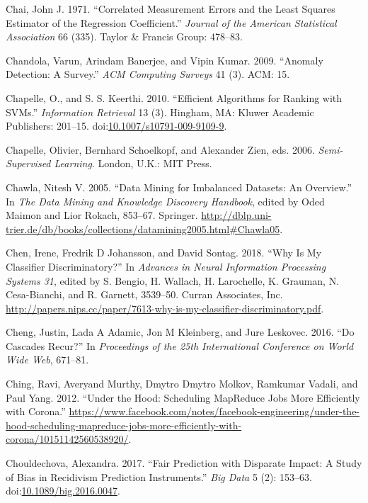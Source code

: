 \documentclass[]{krantz}
\begin{document}
\hypertarget{ref-chai1971correlated}{}
Chai, John J. 1971. ``Correlated Measurement Errors and the Least
Squares Estimator of the Regression Coefficient.'' \emph{Journal of the
American Statistical Association} 66 (335). Taylor \& Francis Group:
478--83.

\hypertarget{ref-chandola2009anomaly}{}
Chandola, Varun, Arindam Banerjee, and Vipin Kumar. 2009. ``Anomaly
Detection: A Survey.'' \emph{ACM Computing Surveys} 41 (3). ACM: 15.

\hypertarget{ref-Chapelle2010}{}
Chapelle, O., and S. S. Keerthi. 2010. ``Efficient Algorithms for
Ranking with SVMs.'' \emph{Information Retrieval} 13 (3). Hingham, MA:
Kluwer Academic Publishers: 201--15.
doi:\href{https://doi.org/10.1007/s10791-009-9109-9}{10.1007/s10791-009-9109-9}.

\hypertarget{ref-Chapelle2006}{}
Chapelle, Olivier, Bernhard Schoelkopf, and Alexander Zien, eds. 2006.
\emph{Semi-Supervised Learning}. London, U.K.: MIT Press.

\hypertarget{ref-Chawla05}{}
Chawla, Nitesh V. 2005. ``Data Mining for Imbalanced Datasets: An
Overview.'' In \emph{The Data Mining and Knowledge Discovery Handbook},
edited by Oded Maimon and Lior Rokach, 853--67. Springer.
\url{http://dblp.uni-trier.de/db/books/collections/datamining2005.html\#Chawla05}.

\hypertarget{ref-chen2018}{}
Chen, Irene, Fredrik D Johansson, and David Sontag. 2018. ``Why Is My
Classifier Discriminatory?'' In \emph{Advances in Neural Information
Processing Systems 31}, edited by S. Bengio, H. Wallach, H. Larochelle,
K. Grauman, N. Cesa-Bianchi, and R. Garnett, 3539--50. Curran
Associates, Inc.
\url{http://papers.nips.cc/paper/7613-why-is-my-classifier-discriminatory.pdf}.

\hypertarget{ref-cheng2016}{}
Cheng, Justin, Lada A Adamic, Jon M Kleinberg, and Jure Leskovec. 2016.
``Do Cascades Recur?'' In \emph{Proceedings of the 25th International
Conference on World Wide Web}, 671--81.

\hypertarget{ref-ching2012}{}
Ching, Ravi, Averyand Murthy, Dmytro Dmytro Molkov, Ramkumar Vadali, and
Paul Yang. 2012. ``Under the Hood: Scheduling MapReduce Jobs More
Efficiently with Corona.''
\url{https://www.facebook.com/notes/facebook-engineering/under-the-hood-scheduling-mapreduce-jobs-more-efficiently-with-corona/10151142560538920/}.

\hypertarget{ref-chouldechova2017}{}
Chouldechova, Alexandra. 2017. ``Fair Prediction with Disparate Impact:
A Study of Bias in Recidivism Prediction Instruments.'' \emph{Big Data}
5 (2): 153--63.
doi:\href{https://doi.org/10.1089/big.2016.0047}{10.1089/big.2016.0047}.
\end{document}
